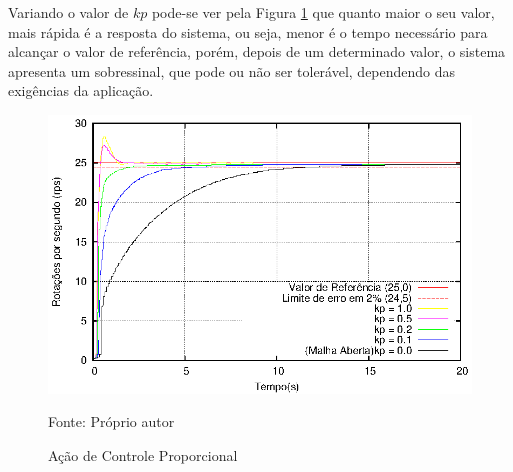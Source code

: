 Variando o valor de $kp$ pode-se ver pela Figura \ref{fig:acaoP} que quanto maior o seu valor, mais rápida é a resposta do sistema, ou seja, menor é o tempo necessário para alcançar o valor de referência, porém, depois de um determinado valor, o sistema apresenta um sobressinal, que pode ou não ser tolerável, dependendo das exigências da aplicação.

\begin{figure}[!htb]
\centering
\caption{Ação de Controle Proporcional}
\center\includegraphics[scale=1.4]{./imagens/acaoP.eps}
\label{fig:acaoP}

{\small Fonte: Próprio autor}
\end{figure}




